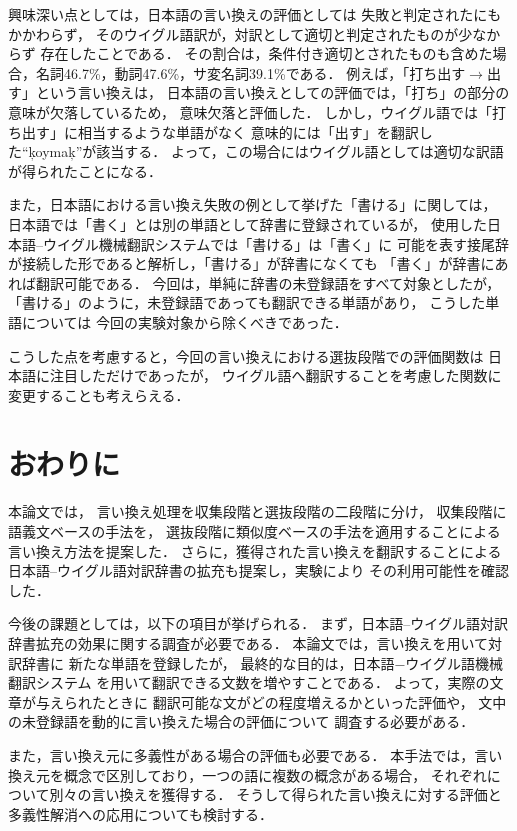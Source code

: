 興味深い点としては，日本語の言い換えの評価としては
失敗と判定されたにもかかわらず，
そのウイグル語訳が，対訳として適切と判定されたものが少なからず
存在したことである．
その割合は，条件付き適切とされたものも含めた場合，名詞46.7\%，動詞47.6\%，サ変名詞39.1\%である．
例えば，「打ち出す$\rightarrow$出す」という言い換えは，
日本語の言い換えとしての評価では，「打ち」の部分の意味が欠落しているため，
意味欠落と評価した．
しかし，ウイグル語では「打ち出す」に相当するような単語がなく
意味的には「出す」を翻訳した``\c koyma\c k''が該当する．
よって，この場合にはウイグル語としては適切な訳語が得られたことになる．

また，日本語における言い換え失敗の例として挙げた「書ける」に関しては，
日本語では「書く」とは別の単語として辞書に登録されているが，
使用した日本語--ウイグル機械翻訳システムでは「書ける」は「書く」に
可能を表す接尾辞が接続した形であると解析し，「書ける」が辞書になくても
「書く」が辞書にあれば翻訳可能である．
今回は，単純に辞書の未登録語をすべて対象としたが，
「書ける」のように，未登録語であっても翻訳できる単語があり，
こうした単語については
今回の実験対象から除くべきであった．

こうした点を考慮すると，今回の言い換えにおける選抜段階での評価関数は
日本語に注目しただけであったが，
ウイグル語へ翻訳することを考慮した関数に変更することも考えらえる．
  
  

\section{おわりに}

本論文では，
言い換え処理を収集段階と選抜段階の二段階に分け，
収集段階に語義文ベースの手法を，
選抜段階に類似度ベースの手法を適用することによる
言い換え方法を提案した．
さらに，獲得された言い換えを翻訳することによる
日本語--ウイグル語対訳辞書の拡充も提案し，実験により
その利用可能性を確認した．


今後の課題としては，以下の項目が挙げられる．
まず，日本語--ウイグル語対訳辞書拡充の効果に関する調査が必要である．
本論文では，言い換えを用いて対訳辞書に
新たな単語を登録したが，
最終的な目的は，日本語−ウイグル語機械翻訳システム
を用いて翻訳できる文数を増やすことである．
よって，実際の文章が与えられたときに
翻訳可能な文がどの程度増えるかといった評価や，
文中の未登録語を動的に言い換えた場合の評価について
調査する必要がある．

また，言い換え元に多義性がある場合の評価も必要である．
本手法では，言い換え元を概念で区別しており，一つの語に複数の概念がある場合，
それぞれについて別々の言い換えを獲得する．
そうして得られた言い換えに対する評価と多義性解消への応用についても検討する．

